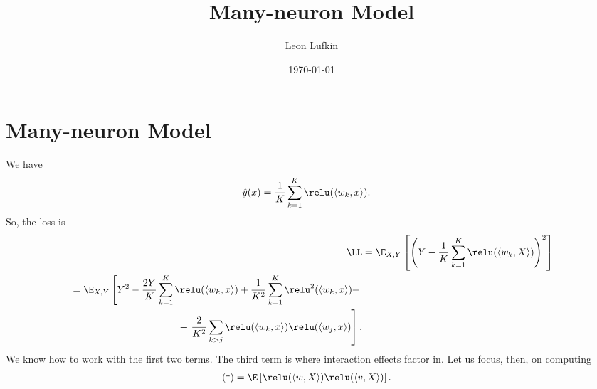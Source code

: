 \documentclass{article}
\title{Many-neuron Model}
\author{Leon Lufkin}
\date{\today}
\begin{document}
\section{Many-neuron Model}
We have
\begin{align}
    \hat{y}(x) &= \frac{1}{K} \sum_{k=1}^{K} \relu(\langle w_k, x \rangle).
\end{align}
So, the loss is
\begin{align}
    \LL 
    &= \E_{X,Y}\left[ \left( Y - \frac{1}{K} \sum_{k=1}^{K} \relu(\langle w_k, X \rangle) \right)^2 \right] \\
    \begin{split}
        &= \E_{X,Y}\left[ Y^2 - \frac{2 Y}{K} \sum_{k=1}^{K} \relu(\langle w_k, x \rangle) + \frac{1}{K^2} \sum_{k=1}^{K} \relu^2(\langle w_k, x \rangle) + \right. \\
        &\hspace{1.5in} + \left. \frac{2}{K^2} \sum_{k>j} \relu(\langle w_k, x \rangle) \relu(\langle w_j, x \rangle) \right].
    \end{split}
\end{align}
We know how to work with the first two terms.
The third term is where interaction effects factor in.
Let us focus, then, on computing
\begin{align}
    (\dagger) &= \E \left[ \relu(\langle w, X \rangle) \relu(\langle v, X \rangle) \right].
\end{align}
\end{document}
